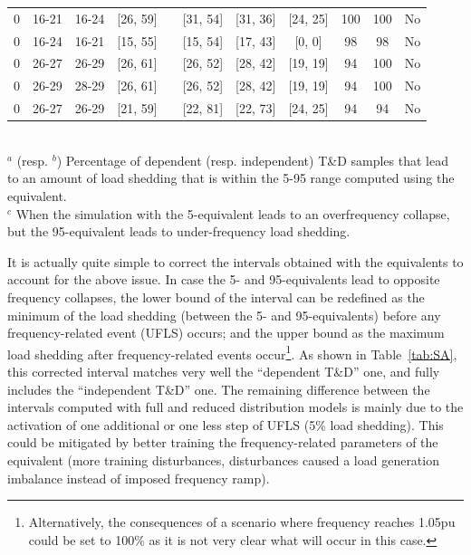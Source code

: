 {\begin{landscape}
\begin{table}
{\begin{tabular}{@{}ccccccccccc@{}}
0   & 16-21 & 16-24 & [26, 59] & & [31, 54] & [31, 36] & [24, 25]  & 100 & 100 & No  \\
0   & 16-24 & 16-21 & [15, 55] & & [15, 54] & [17, 43] & [0, 0]  & 98  & 98  & No  \\
0   & 26-27 & 26-29 & [26, 61] & & [26, 52] & [28, 42] & [19, 19]  & 94  & 100 & No  \\
0   & 26-29 & 28-29 & [26, 61] & & [26, 52] & [28, 42] & [19, 19]  & 94  & 100 & No  \\
0   & 26-27 & 26-29 & [21, 59] & & [22, 81] & [22, 73] & [24, 25]  & 94  & 94  & No  \\ \bottomrule
\end{tabular}
} \\ \vspace{0.1cm}
\footnotesize{\(^a\) (resp. \(^b\)) Percentage of dependent (resp. independent) T\&D samples that lead to an amount of load shedding that is within the 5-95 range computed using the equivalent. \\$^c$ When the simulation with the 5-equivalent leads to an overfrequency collapse, but the 95-equivalent leads to under-frequency load shedding.}
\end{table}
\end{landscape}
\clearpage%
}

It is actually quite simple to correct the intervals obtained with the equivalents to account for the above issue. In case the 5- and 95-equivalents lead to opposite frequency collapses, the lower bound of the interval can be redefined as the minimum of the load shedding (between the 5- and 95-equivalents) before any frequency-related event (\eg UFLS) occurs; and the upper bound as the maximum load shedding after frequency-related events occur\footnote{Alternatively, the consequences of a scenario where frequency reaches 1.05pu could be set to 100\% as it is not very clear what will occur in this case.}. As shown in Table~\ref{tab:SA}, this corrected interval matches very well the ``dependent T\&D'' one, and fully includes the ``independent T\&D'' one. The remaining difference between the intervals computed with full and reduced distribution models is mainly due to the activation of one additional or one less step of UFLS (5\% load shedding). This could be mitigated by better training the frequency-related parameters of the equivalent (\eg more training disturbances, disturbances caused a load generation imbalance instead of imposed frequency ramp).


